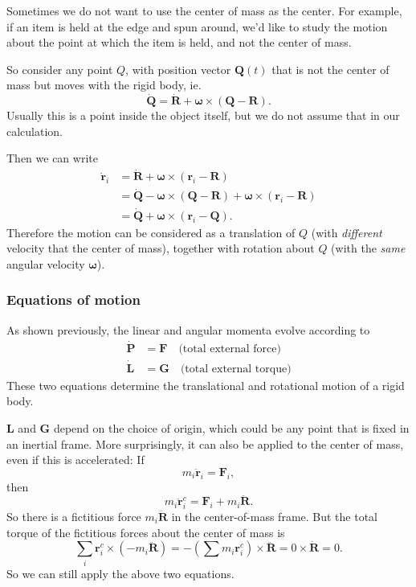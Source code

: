 \documentclass[a4paper]{article}
\begin{document}
Sometimes we do not want to use the center of mass as the center. For example, if an item is held at the edge and spun around, we'd like to study the motion about the point at which the item is held, and not the center of mass.

So consider any point $Q$, with position vector $\mathbf{Q}(t)$ that is not the center of mass but moves with the rigid body, ie.
\[
  \dot{\mathbf{Q}} = \dot{\mathbf{R}} + \boldsymbol\omega\times (\mathbf{Q} - \mathbf{R}).
\]
Usually this is a point inside the object itself, but we do not assume that in our calculation.

Then we can write
\begin{align*}
  \dot{\mathbf{r}}_i &= \dot{\mathbf{R}} + \boldsymbol\omega\times (\mathbf{r}_i - \mathbf{R})\\
  &= \dot{\mathbf{Q}} - \boldsymbol\omega\times (\mathbf{Q} - \mathbf{R}) + \boldsymbol\omega \times (\mathbf{r}_i - \mathbf{R})\\
  &= \dot{\mathbf{Q}} + \boldsymbol\omega\times (\mathbf{r}_i - \mathbf{Q}).
\end{align*}
Therefore the motion can be considered as a translation of $Q$ (with \emph{different} velocity that the center of mass), together with rotation about $Q$ (with the \emph{same} angular velocity $\boldsymbol\omega$).

\subsubsection*{Equations of motion}
As shown previously, the linear and angular momenta evolve according to
\begin{align*}
  \dot{\mathbf{P}} &= \mathbf{F}\quad \text{(total external force)}\\
  \dot{\mathbf{L}} &= \mathbf{G}\quad \text{(total external torque)}
\end{align*}
These two equations determine the translational and rotational motion of a rigid body.

$\mathbf{L}$ and $\mathbf{G}$ depend on the choice of origin, which could be any point that is fixed in an inertial frame. More surprisingly, it can also be applied to the center of mass, even if this is accelerated:
If
\[
  m_i \ddot{\mathbf{r}}_i = \mathbf{F}_i,
\]
then
\[
  m_i \ddot{\mathbf{r}}_i^c = \mathbf{F}_i + m_i \ddot{\mathbf{R}}.
\]
So there is a fictitious force $m_i \ddot{\mathbf{R}}$ in the center-of-mass frame. But the total torque of the fictitious forces about the center of mass is
\[
  \sum_i \mathbf{r}_i^c \times \left(-m_i \ddot{\mathbf{R}}\right) = -\left(\sum m_i \mathbf{r}_i^c\right) \times \ddot{\mathbf{R}} = 0\times \dot{\mathbf{R}} = 0.
\]
So we can still apply the above two equations.
\end{document}
